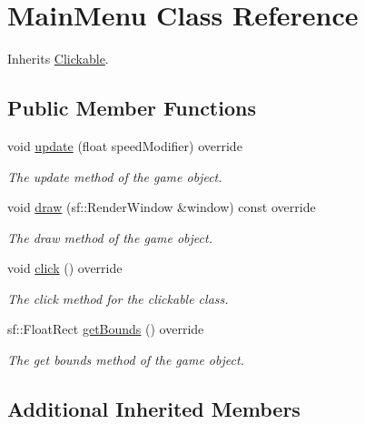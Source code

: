 \hypertarget{class_main_menu}{\section{Main\+Menu Class Reference}
\label{class_main_menu}
}


Inherits \hyperlink{class_clickable}{Clickable}.

\subsection*{Public Member Functions}
\begin{DoxyCompactItemize}
\item 
void \hyperlink{class_main_menu_a41b86746c468d18532123dfda01425de}{update} (float speed\+Modifier) override
\begin{DoxyCompactList}\small\item\em The update method of the game object. \end{DoxyCompactList}\item 
void \hyperlink{class_main_menu_a2956b42855e47b2e8e10412a26ef672b}{draw} (sf\+::\+Render\+Window \&window) const override
\begin{DoxyCompactList}\small\item\em The draw method of the game object. \end{DoxyCompactList}\item 
void \hyperlink{class_main_menu_ac97a553b913177aeabeb0bfcc4b54caa}{click} () override
\begin{DoxyCompactList}\small\item\em The click method for the clickable class. \end{DoxyCompactList}\item 
sf\+::\+Float\+Rect \hyperlink{class_main_menu_a6a52b7d7cb8e09360ebc3428aad67ed1}{get\+Bounds} () override
\begin{DoxyCompactList}\small\item\em The get bounds method of the game object. \end{DoxyCompactList}\end{DoxyCompactItemize}
\subsection*{Additional Inherited Members}


